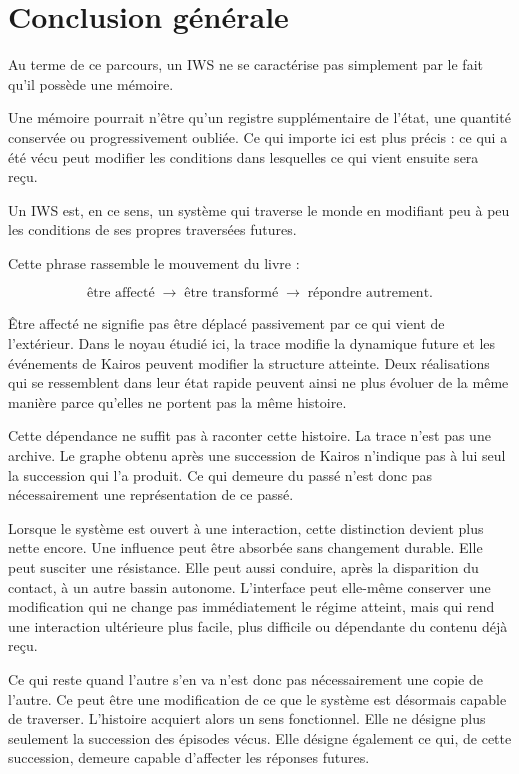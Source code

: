 \documentclass[
  11pt,
  a4paper,
  openany]{book}
\theoremstyle{definition}
\begin{document}
\chapter*{Conclusion générale}

Au terme de ce parcours, un IWS ne se caractérise pas simplement par le fait qu'il possède une mémoire.

Une mémoire pourrait n'être qu'un registre supplémentaire de l'état, une quantité conservée ou progressivement oubliée. Ce qui importe ici est plus précis : ce qui a été vécu peut modifier les conditions dans lesquelles ce qui vient ensuite sera reçu.

Un IWS est, en ce sens, un système qui traverse le monde en modifiant peu à peu les conditions de ses propres traversées futures.

Cette phrase rassemble le mouvement du livre :

\[
\text{être affecté}
\;\longrightarrow\;
\text{être transformé}
\;\longrightarrow\;
\text{répondre autrement}.
\]

Être affecté ne signifie pas être déplacé passivement par ce qui vient de l'extérieur. Dans le noyau étudié ici, la trace modifie la dynamique future et les événements de Kairos peuvent modifier la structure atteinte. Deux réalisations qui se ressemblent dans leur état rapide peuvent ainsi ne plus évoluer de la même manière parce qu'elles ne portent pas la même histoire.

Cette dépendance ne suffit pas à raconter cette histoire. La trace n'est pas une archive. Le graphe obtenu après une succession de Kairos n'indique pas à lui seul la succession qui l'a produit. Ce qui demeure du passé n'est donc pas nécessairement une représentation de ce passé.

Lorsque le système est ouvert à une interaction, cette distinction devient plus nette encore. Une influence peut être absorbée sans changement durable. Elle peut susciter une résistance. Elle peut aussi conduire, après la disparition du contact, à un autre bassin autonome. L'interface peut elle-même conserver une modification qui ne change pas immédiatement le régime atteint, mais qui rend une interaction ultérieure plus facile, plus difficile ou dépendante du contenu déjà reçu.

Ce qui reste quand l'autre s'en va n'est donc pas nécessairement une copie de l'autre. Ce peut être une modification de ce que le système est désormais capable de traverser. L'histoire acquiert alors un sens fonctionnel. Elle ne désigne plus seulement la succession des épisodes vécus. Elle désigne également ce qui, de cette succession, demeure capable d'affecter les réponses futures.
\end{document}
